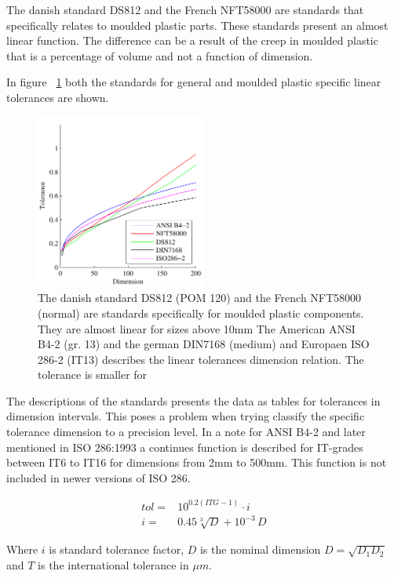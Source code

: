 \documentclass[aip,amsmath, reprint, author-year]{revtex4-1}
\begin{document}
The danish standard DS812 and the French NFT58000 are standards that specifically relates to moulded plastic parts. These standards present an almost linear function. The difference can be a result of the creep in moulded plastic that is a percentage of volume and not a function of dimension.

In figure ~\ref{fig:tolstd} both the standards for general and moulded plastic specific linear tolerances are shown.

\begin{figure}
\includegraphics[width=0.5\textwidth]{Tolerance_standards.pdf}
\caption{\label{fig:tolstd} The danish standard DS812 (POM 120) and the French NFT58000 (normal) are standards specifically for moulded plastic components. They are almost linear for sizes above 10mm The American ANSI B4-2 (gr. 13) and the german DIN7168 (medium) and Europaen ISO 286-2 (IT13) describes the linear tolerances dimension relation. The tolerance is smaller for }
\end{figure}

The descriptions of the standards presents the data as tables for tolerances in dimension intervals. This poses a problem when trying classify the specific tolerance dimension to a precision level.
In a note for ANSI B4-2  and later mentioned in ISO 286:1993 a continues function is described for IT-grades between IT6 to IT16 for dimensions from 2mm to 500mm. This function is not included in newer versions of ISO 286.

\begin{align}
	tol =& 10^{0.2 (ITG -1)} \cdot i \\
	i =& 0.45 \sqrt[3]{D} + 10^{-3} \, D 
\end{align}

Where $i$ is standard tolerance factor, $D$ is the nominal dimension $D = \sqrt{D_1 D_2}$ and $T$ is the international tolerance in $\mu m$.
\end{document}
